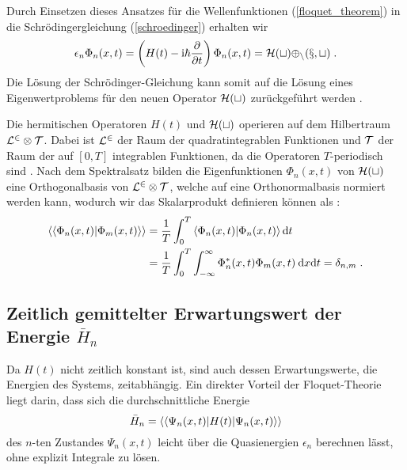   Durch Einsetzen dieses Ansatzes für die Wellenfunktionen (\ref{floquet_theorem}) in die Schrödingergleichung (\ref{schroedinger}) erhalten wir
  \begin{equation}
    \epsilon_n \Phi_n(x,t) = \left(H(t)-\text{i}\hbar\frac{\partial}{\partial t}\right)\Phi_n(x,t) = \cal{H}(t) \Phi_n(x,t) \; .
    \label{eigenwertproblem}
  \end{equation}
  Die Lösung der Schrödinger-Gleichung kann somit auf die Lösung eines Eigenwertproblems für den neuen Operator $\cal{H}(t)$ zurückgeführt werden \cite{sherly}.

  Die hermitischen Operatoren $H(t)$ und $\cal H(t)$ operieren auf dem Hilbertraum $\cal{L}^2 \otimes \cal{T}$.
  Dabei ist $\cal{L}^2$ der Raum der quadratintegrablen Funktionen und $\cal{T}$ der Raum der auf $[0,T]$ integrablen Funktionen, da die Operatoren $T$-periodisch sind \cite{haengi}.
  Nach dem Spektralsatz bilden die Eigenfunktionen $\Phi_n(x,t)$ von $\cal{H}(t)$ eine Orthogonalbasis von $\cal{L}^2 \otimes \cal{T}$, welche auf eine Orthonormalbasis normiert werden kann, wodurch wir das Skalarprodukt definieren können als \cite{haengi}:
  \begin{align}
    \begin{split}
    \braket{\braket{\Phi_n(x,t)|\Phi_m(x,t)}} &= \frac{1}{T} \int_0^T \braket{\Phi_n(x,t)|\Phi_n(x,t)} \text{d}t \\
    &= \frac{1}{T} \int_0^T \int_{-\infty}^{\infty} \Phi_n^*(x,t)\Phi_m(x,t) \: \text{d}x\text{d}t = \delta_{n,m} \; .
    \label{skalarprodukt_einzelner}
    \end{split}
  \end{align}


 \subsection{\texorpdfstring{Zeitlich gemittelter Erwartungswert der Energie $\bar{H}_n$}{Zeitlich gemittelter Erwartungswert der Energie bar{H}_n}}

    Da $H(t)$ nicht zeitlich konstant ist, sind auch dessen Erwartungswerte, die Energien des Systems, zeitabhängig.
    Ein direkter Vorteil der Floquet-Theorie liegt darin, dass sich die durchschnittliche Energie
    \begin{equation}
      \bar{H}_n  = \braket{\braket{\Psi_n(x,t)|H(t)|\Psi_n(x,t)}}
    \end{equation}
    des $n$-ten Zustandes $\Psi_n(x,t)$ leicht über die Quasienergien $\epsilon_n$ berechnen lässt, ohne explizit Integrale zu lösen.

